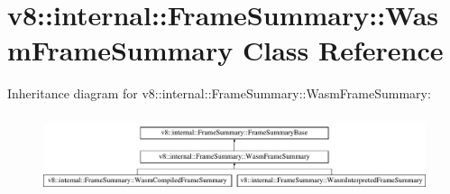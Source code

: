 \hypertarget{classv8_1_1internal_1_1FrameSummary_1_1WasmFrameSummary}{}\section{v8\+:\+:internal\+:\+:Frame\+Summary\+:\+:Wasm\+Frame\+Summary Class Reference}
\label{classv8_1_1internal_1_1FrameSummary_1_1WasmFrameSummary}
Inheritance diagram for v8\+:\+:internal\+:\+:Frame\+Summary\+:\+:Wasm\+Frame\+Summary\+:\begin{figure}[H]
\begin{center}
\leavevmode
\includegraphics[height=2.307692cm]{classv8_1_1internal_1_1FrameSummary_1_1WasmFrameSummary}
\end{center}
\end{figure}
